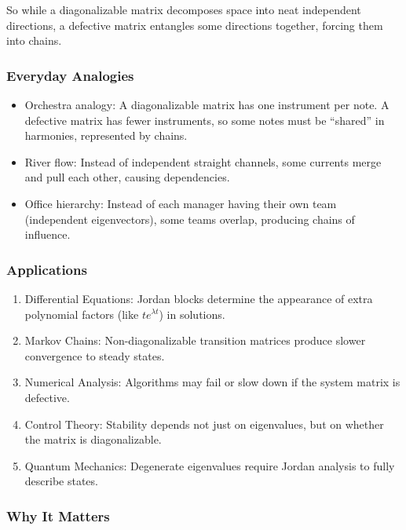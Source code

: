 \documentclass[
  letterpaper,
  DIV=11,
  numbers=noendperiod]{scrreprt}
\providecommand{\tightlist}{%
  \setlength{\itemsep}{0pt}\setlength{\parskip}{0pt}}
\begin{document}
So while a diagonalizable matrix decomposes space into neat independent
directions, a defective matrix entangles some directions together,
forcing them into chains.

\subsubsection{Everyday Analogies}\label{everyday-analogies-63}

\begin{itemize}
\tightlist
\item
  Orchestra analogy: A diagonalizable matrix has one instrument per
  note. A defective matrix has fewer instruments, so some notes must be
  ``shared'' in harmonies, represented by chains.
\item
  River flow: Instead of independent straight channels, some currents
  merge and pull each other, causing dependencies.
\item
  Office hierarchy: Instead of each manager having their own team
  (independent eigenvectors), some teams overlap, producing chains of
  influence.
\end{itemize}

\subsubsection{Applications}\label{applications-29}

\begin{enumerate}
\def\labelenumi{\arabic{enumi}.}
\tightlist
\item
  Differential Equations: Jordan blocks determine the appearance of
  extra polynomial factors (like \(t e^{\lambda t}\)) in solutions.
\item
  Markov Chains: Non-diagonalizable transition matrices produce slower
  convergence to steady states.
\item
  Numerical Analysis: Algorithms may fail or slow down if the system
  matrix is defective.
\item
  Control Theory: Stability depends not just on eigenvalues, but on
  whether the matrix is diagonalizable.
\item
  Quantum Mechanics: Degenerate eigenvalues require Jordan analysis to
  fully describe states.
\end{enumerate}

\subsubsection{Why It Matters}\label{why-it-matters-63}
\end{document}
